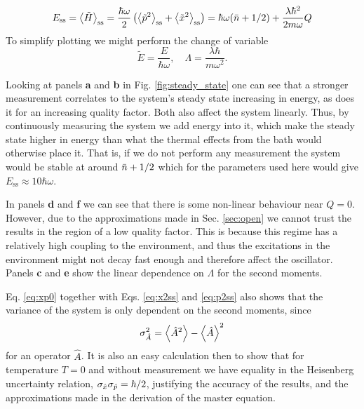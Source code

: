 \begin{equation}
    E_\mathrm{ss} = \expval{\tilde{H}}_\mathrm{ss} = \frac{\hbar \omega}{2} \left( \expval{\tilde{p}^2}_\text{ss} + \expval{\tilde{x}^2}_\text{ss} \right) = \hbar\omega (\bar{n} + 1/2)+ \frac{\lambda \hbar^2}{2 m\omega} Q
    \label{eq:ess}
\end{equation}
To simplify plotting we might perform the change of variable
\begin{equation}
    \tilde{E} =\frac{E}{\hbar\omega}, \quad \Lambda = \frac{\lambda \hbar}{m \omega^2}.
\end{equation}



Looking at panels \textbf{a} and \textbf{b} in Fig. \ref{fig:steady_state} one can see that a stronger measurement correlates to the system's steady state increasing in energy, as does it for an increasing quality factor. Both also affect the system linearly. Thus, by continuously measuring the system we add energy into it, which make the steady state higher in energy than what the thermal effects from the bath would otherwise place it. That is, if we do not perform any measurement the system would be stable at around $\bar{n} + 1/2$ which for the parameters used here would give $E_\text{ss} \approx 10\hbar\omega$.

In panels \textbf{d} and \textbf{f} we can see that there is some non-linear behaviour near $Q = 0$. However, due to the approximations made in Sec. \ref{sec:open} we cannot trust the results in the region of a low quality factor. This is because this regime has a relatively high coupling to the environment, and thus the excitations in the environment might not decay fast enough and therefore affect the oscillator. Panels \textbf{c} and \textbf{e} show the linear dependence on $\Lambda$ for the second moments.


Eq. \eqref{eq:xp0} together with Eqs. \eqref{eq:x2ss} and \eqref{eq:p2ss} also shows that the variance of the system is only dependent on the second moments, since
\begin{equation}
    \sigma^2_{\hat{A}} = \expval{\hat{A}^2} - \expval{\hat{A}}^2
\end{equation}
for an operator $\hat{A}$. It is also an easy calculation then to show that for temperature $T=0$ and without measurement we have equality in the Heisenberg uncertainty relation, $\sigma_{\hat{x}} \sigma_{\hat{p}} = \hbar/2$, justifying the accuracy of the results, and the approximations made in the derivation of the master equation.


